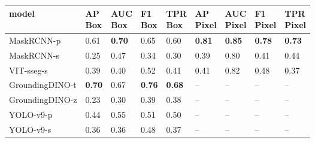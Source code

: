 \documentclass{article}
\begin{document}
\begin{table}[t]
\begin{tabular}{lllllllll}
\hline
 model           & \makecell{AP\\Box}   & \makecell{AUC\\Box}   & \makecell{F1\\Box}   & \makecell{TPR\\Box}   & \makecell{AP\\Pixel}   & \makecell{AUC\\Pixel}   & \makecell{F1\\Pixel}   & \makecell{TPR\\Pixel}     \\
\hline
 MaskRCNN-p      & 0.61          & \textbf{0.70} & 0.65          & 0.60          & \textbf{0.81} & \textbf{0.85} & \textbf{0.78} & \textbf{0.73} \\
 MaskRCNN-s      & 0.25          & 0.47          & 0.34          & 0.30          & 0.39          & 0.80          & 0.41          & 0.44          \\
 VIT-sseg-s      & 0.39          & 0.40          & 0.52          & 0.41          & 0.41          & 0.82          & 0.48          & 0.37          \\
 GroundingDINO-t & \textbf{0.70} & 0.67          & \textbf{0.76} & \textbf{0.68} & --            & --            & --            & --            \\
 GroundingDINO-z & 0.23          & 0.30          & 0.39          & 0.38          & --            & --            & --            & --            \\
 YOLO-v9-p       & 0.44          & 0.55          & 0.51          & 0.50          & --            & --            & --            & --            \\
 YOLO-v9-s       & 0.36          & 0.36          & 0.48          & 0.37          & --            & --            & --            & --            \\
\hline

\end{tabular}




\end{table}
\end{document}
